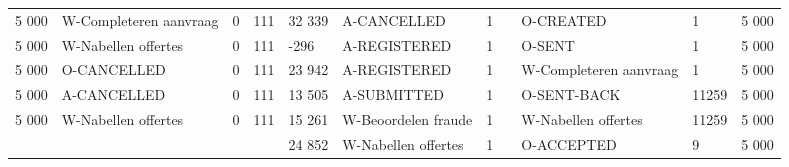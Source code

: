 \begin{tabular}{lllllllllll}
5 000 & W-Completeren aanvraag & 0 & 111 & 32 339 & A-CANCELLED & 1 &  & O-CREATED & 1 & 5 000 \\
5 000 & W-Nabellen offertes & 0 & 111 & -296 & A-REGISTERED & 1 &  & O-SENT & 1 & 5 000 \\
5 000 & O-CANCELLED & 0 & 111 & 23 942 & A-REGISTERED & 1 &  & W-Completeren aanvraag & 1 & 5 000 \\
5 000 & A-CANCELLED & 0 & 111 & 13 505 & A-SUBMITTED & 1 &  & O-SENT-BACK & 11259 & 5 000 \\
5 000 & W-Nabellen offertes & 0 & 111 & 15 261 & W-Beoordelen fraude & 1 &  & W-Nabellen offertes & 11259 & 5 000 \\
 &  &  &  & 24 852 & W-Nabellen offertes & 1 &  & O-ACCEPTED & 9 & 5 000 \\
\bottomrule
\end{tabular}
